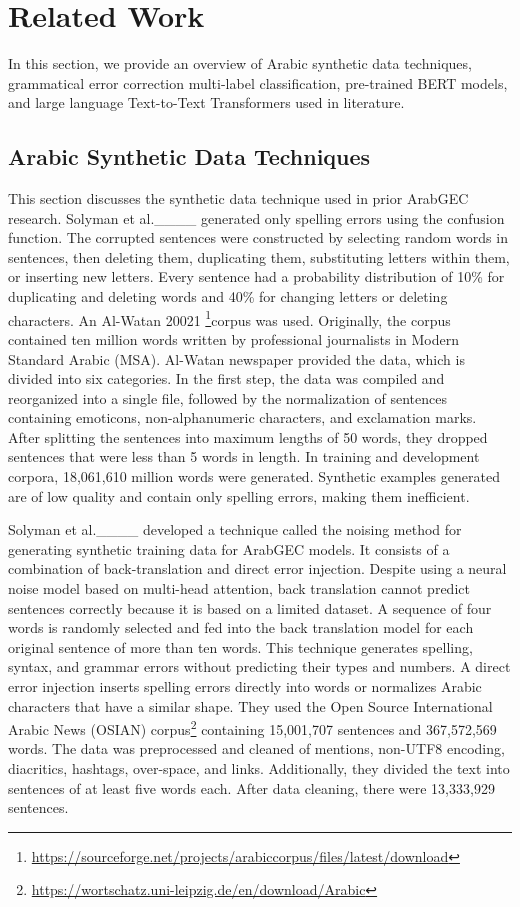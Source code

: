 \section{Related Work}
In this section, we provide an overview of Arabic synthetic data techniques, grammatical error correction multi-label classification, pre-trained BERT models, and large language Text-to-Text Transformers used in literature.

\subsection{Arabic Synthetic Data Techniques}
This section discusses the synthetic data technique used in prior ArabGEC research. Solyman et al.____ generated only spelling errors using the confusion function. The corrupted sentences were constructed by selecting random words in sentences, then deleting them, duplicating them, substituting letters within them, or inserting new letters. Every sentence had a probability distribution of 10\% for duplicating and deleting words and 40\% for changing letters or deleting characters. An Al-Watan 20021 \footnote{\url{https://sourceforge.net/projects/arabiccorpus/files/latest/download}}corpus was used. Originally, the corpus contained ten million words written by professional journalists in Modern Standard Arabic (MSA). Al-Watan newspaper provided the data, which is divided into six categories. In the first step, the data was compiled and reorganized into a single file, followed by the normalization of sentences containing emoticons, non-alphanumeric characters, and exclamation marks. After splitting the sentences into maximum lengths of 50 words, they dropped sentences that were less than 5 words in length. In training and development corpora, 18,061,610 million words were generated. Synthetic examples generated are of low quality and contain only spelling errors, making them inefficient.

Solyman et al.____  developed a technique called the noising method for generating synthetic training data for ArabGEC models. It consists of a combination of back-translation and direct error injection. Despite using a neural noise model based on multi-head attention, back translation cannot predict sentences correctly because it is based on a limited dataset. A sequence of four words is randomly selected and fed into the back translation model for each original sentence of more than ten words. This technique generates spelling, syntax, and grammar errors without predicting their types and numbers. A direct error injection inserts spelling errors directly into words or normalizes Arabic characters that have a similar shape. They used the Open Source International Arabic News (OSIAN) corpus\footnote{\url{https://wortschatz.uni-leipzig.de/en/download/Arabic}} containing 15,001,707 sentences and 367,572,569 words. The data was preprocessed and cleaned of mentions, non-UTF8 encoding, diacritics, hashtags, over-space, and links. Additionally, they divided the text into sentences of at least five words each. After data cleaning, there were 13,333,929 sentences.

